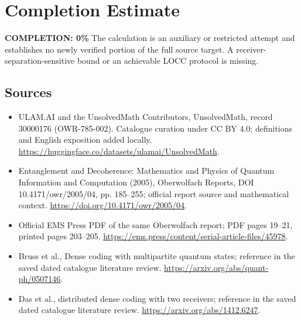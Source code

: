 \documentclass[11pt]{article}
\begin{document}
\section{Completion Estimate}
\noindent\textbf{COMPLETION: 0\%}
The calculation is an auxiliary or restricted attempt and establishes no newly verified portion of the full source target. A receiver-separation-sensitive bound or an achievable LOCC protocol is missing.

\subsection{Sources}
\begin{itemize}
\item[\hypertarget{source:30000176:1}{S1}] ULAM.AI and the UnsolvedMath Contributors, UnsolvedMath, record 30000176 (OWR-785-002). Catalogue curation under CC BY 4.0; definitions and English exposition added locally.
\url{https://huggingface.co/datasets/ulamai/UnsolvedMath}.
\item[\hypertarget{source:30000176:2}{S2}] Entanglement and Decoherence: Mathematics and Physics of Quantum Information and Computation (2005), Oberwolfach Reports, DOI 10.4171/owr/2005/04, pp. 185--255; official report source and mathematical context.
\url{https://doi.org/10.4171/owr/2005/04}.
\item[\hypertarget{source:30000176:3}{S3}] Official EMS Press PDF of the same Oberwolfach report; PDF pages 19--21, printed pages 203--205.
\url{https://ems.press/content/serial-article-files/45978}.
\item[\hypertarget{source:30000176:4}{S4}] Bruss et al., Dense coding with multipartite quantum states; reference in the saved dated catalogue literature review.
\url{https://arxiv.org/abs/quant-ph/0507146}.
\item[\hypertarget{source:30000176:5}{S5}] Das et al., distributed dense coding with two receivers; reference in the saved dated catalogue literature review.
\url{https://arxiv.org/abs/1412.6247}.
\end{itemize}
\label{end:30000176}
\end{document}

